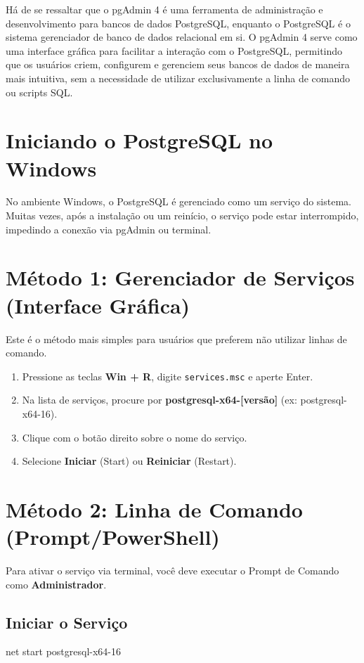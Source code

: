 Há de se ressaltar que o pgAdmin 4 é uma ferramenta de administração e desenvolvimento para bancos de dados PostgreSQL, enquanto o PostgreSQL é o sistema gerenciador de banco de dados relacional em si. O pgAdmin 4 serve como uma interface gráfica para facilitar a interação com o PostgreSQL, permitindo que os usuários criem, configurem e gerenciem seus bancos de dados de maneira mais intuitiva, sem a necessidade de utilizar exclusivamente a linha de comando ou scripts SQL.



\section{Iniciando o PostgreSQL no Windows}
No ambiente Windows, o PostgreSQL é gerenciado como um serviço do sistema. Muitas vezes, após a instalação ou um reinício, o serviço pode estar interrompido, impedindo a conexão via pgAdmin ou terminal.

\section{Método 1: Gerenciador de Serviços (Interface Gráfica)}
Este é o método mais simples para usuários que preferem não utilizar linhas de comando.

\begin{enumerate}
    \item Pressione as teclas \textbf{Win + R}, digite \texttt{services.msc} e aperte Enter.
    \item Na lista de serviços, procure por \textbf{postgresql-x64-[versão]} (ex: postgresql-x64-16).
    \item Clique com o botão direito sobre o nome do serviço.
    \item Selecione \textbf{Iniciar} (Start) ou \textbf{Reiniciar} (Restart).
\end{enumerate}



\section{Método 2: Linha de Comando (Prompt/PowerShell)}
Para ativar o serviço via terminal, você deve executar o Prompt de Comando como \textbf{Administrador}.

\subsection{Iniciar o Serviço}
\begin{sqlcode}
net start postgresql-x64-16
\end{sqlcode}

